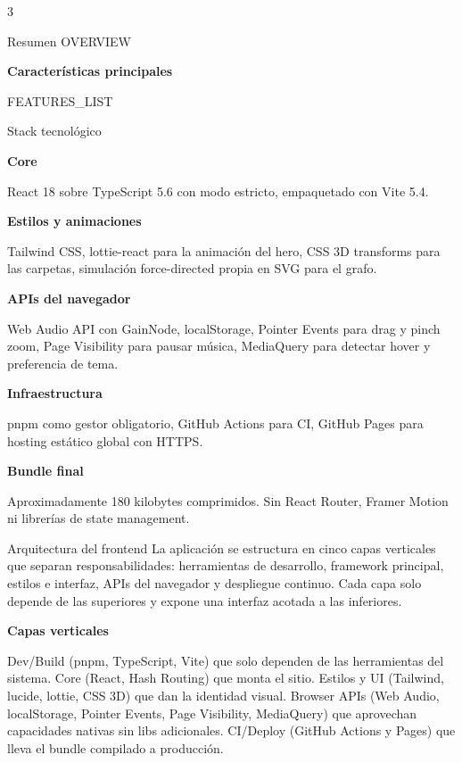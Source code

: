 \documentclass[10pt]{article}
\newcommand{\posterheading}[1]{%
  \vspace{4pt}%
  \par{\color{accentdark}\sffamily\bfseries #1}\par
  \vspace{2pt}%
}
\begin{document}
\setlength{\columnsep}{18pt}
\begin{multicols}{3}


\begin{posterblock}{Resumen}
{{OVERVIEW}}

\posterheading{Características principales}
{{FEATURES_LIST}}
\end{posterblock}

\begin{posterblock}{Stack tecnológico}
\posterheading{Core}
React 18 sobre TypeScript 5.6 con modo estricto, empaquetado con Vite 5.4.

\posterheading{Estilos y animaciones}
Tailwind CSS, lottie-react para la animación del hero, CSS 3D transforms para las carpetas, simulación force-directed propia en SVG para el grafo.

\posterheading{APIs del navegador}
Web Audio API con GainNode, localStorage, Pointer Events para drag y pinch zoom, Page Visibility para pausar música, MediaQuery para detectar hover y preferencia de tema.

\posterheading{Infraestructura}
pnpm como gestor obligatorio, GitHub Actions para CI, GitHub Pages para hosting estático global con HTTPS.

\posterheading{Bundle final}
Aproximadamente 180 kilobytes comprimidos. Sin React Router, Framer Motion ni librerías de state management.
\end{posterblock}


\begin{posterblock}{Arquitectura del frontend}
La aplicación se estructura en cinco capas verticales que separan responsabilidades: herramientas de desarrollo, framework principal, estilos e interfaz, APIs del navegador y despliegue continuo. Cada capa solo depende de las superiores y expone una interfaz acotada a las inferiores.

\posterheading{Capas verticales}
Dev/Build (pnpm, TypeScript, Vite) que solo dependen de las herramientas del sistema. Core (React, Hash Routing) que monta el sitio. Estilos y UI (Tailwind, lucide, lottie, CSS 3D) que dan la identidad visual. Browser APIs (Web Audio, localStorage, Pointer Events, Page Visibility, MediaQuery) que aprovechan capacidades nativas sin libs adicionales. CI/Deploy (GitHub Actions y Pages) que lleva el bundle compilado a producción.


\end{posterblock}
\end{multicols}
\end{document}
